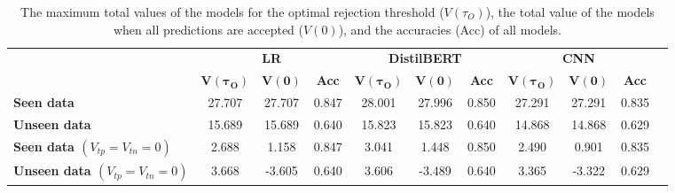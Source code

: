 \begin{table}
    \scriptsize
    \centering
    \setlength\tabcolsep{5pt}
    \begin{tabular}{lcccccccccc}
        \toprule
                                                 & \multicolumn{3}{c}{\textbf{LR}} & \multicolumn{3}{c}{\textbf{DistilBERT}} & \multicolumn{3}{c}{\textbf{CNN}}                                                                                                                                 \\
        \cmidrule(l){2-4} \cmidrule(l){5-7} \cmidrule(l){8-10}
                                                 & $\boldsymbol{V(\tau_O)}$        & $\boldsymbol{V(0)}$                     & \textbf{Acc}                     & $\boldsymbol{V(\tau_O)}$ & $\boldsymbol{V(0)}$ & \textbf{Acc} & $\boldsymbol{V(\tau_O)}$ & $\boldsymbol{V(0)}$ & \textbf{Acc} \\
        \midrule
        \textbf{Seen data}                       & 27.707                          & 27.707                                  & 0.847                            & 28.001                   & 27.996              & 0.850        & 27.291                   & 27.291              & 0.835        \\
        \textbf{Unseen data}                     & 15.689                          & 15.689                                  & 0.640                            & 15.823                   & 15.823              & 0.640        & 14.868                   & 14.868              & 0.629        \\
        \midrule
        \textbf{Seen data $(V_{tp}=V_{tn}=0)$}   & 2.688                           & 1.158                                   & 0.847                            & 3.041                    & 1.448               & 0.850        & 2.490                    & 0.901               & 0.835        \\
        \textbf{Unseen data $(V_{tp}=V_{tn}=0)$} & 3.668                           & -3.605                                  & 0.640                            & 3.606                    & -3.489              & 0.640        & 3.365                    & -3.322              & 0.629        \\
        \bottomrule
    \end{tabular}
    \caption{The maximum total values of the models for the optimal rejection threshold ($V(\tau_O)$), the total value of the models when all predictions are accepted ($V(0)$), and the accuracies (Acc) of all models.}
    \label{tab:metric2}
\end{table}